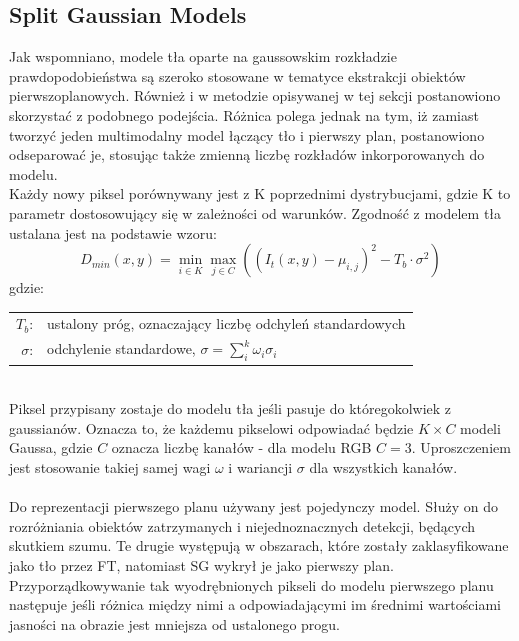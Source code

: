 \subsection{Split Gaussian Models}
\label{sec:SG}
Jak wspomniano, modele tła oparte na gaussowskim rozkładzie prawdopodobieństwa są szeroko stosowane w tematyce ekstrakcji obiektów pierwszoplanowych. Również i w metodzie opisywanej w tej sekcji postanowiono skorzystać z podobnego podejścia. Różnica polega jednak na tym, iż zamiast tworzyć jeden multimodalny model łączący tło i pierwszy plan, postanowiono odseparować je, stosując także zmienną liczbę rozkładów inkorporowanych do modelu.\\
Każdy nowy piksel porównywany jest z K poprzednimi dystrybucjami, gdzie K to parametr dostosowujący się w zależności od warunków. Zgodność z modelem tła ustalana jest na podstawie wzoru:
\begin{equation}
D_{min}(x,y) = \min_{i\in K}\max_{j\in C}((I_{t}(x,y)-\mu_{i,j})^2-T_{b}\cdot\sigma^2)
\end{equation}
gdzie:\\ 
\hspace*{3em}
\begin{tabular}{r l}
$T_{b}$: &  ustalony próg, oznaczający liczbę odchyleń standardowych\\
$\sigma$: & odchylenie standardowe, $\sigma = \sum_{i}^{k}\omega_{i}\sigma_{i}$
\end{tabular} \\

Piksel przypisany zostaje do modelu tła jeśli pasuje do któregokolwiek z gaussianów. Oznacza to, że każdemu pikselowi odpowiadać będzie $K\times C$ modeli Gaussa, gdzie $C$ oznacza liczbę kanałów - dla modelu RGB $C = 3$. Uproszczeniem jest stosowanie takiej samej wagi $\omega$ i wariancji $\sigma$ dla wszystkich kanałów.
\paragraph{}
Do reprezentacji pierwszego planu używany jest pojedynczy model. Służy on do rozróżniania obiektów zatrzymanych i niejednoznacznych detekcji, będących skutkiem szumu. Te drugie występują w obszarach, które zostały zaklasyfikowane jako tło przez FT, natomiast SG wykrył je jako pierwszy plan. Przyporządkowywanie tak wyodrębnionych pikseli do modelu pierwszego planu następuje jeśli różnica między nimi a odpowiadającymi im średnimi wartościami jasności na obrazie jest mniejsza od ustalonego progu.
